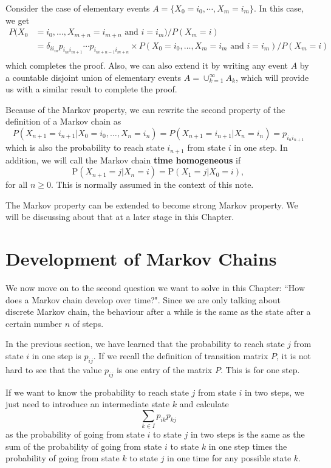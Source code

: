 \documentclass[11pt, a4paper, oneside]{book}
\theoremstyle{definition}
\begin{document}
\noindent Consider the case of elementary events $A = \{ X_0 = i_0, \cdots , X_m = i_m \}$. In this case, we get 
\begin{equation*}
\begin{split}
P(X_0 &= i_0, \dots, X_{m+n} = i_{m+n}\text{ and } i = i_m) / P(X_m = i) \\
&= \delta_{ii_m} p_{i_m i_{m+1}} \cdots p_{i_{m+n-1} i_{m+n}} \times P(X_0 = i_0, \dots, X_m = i_m \text{ and } i = i_m) / P(X_m = i) \\
\end{split}
\end{equation*}
which completes the proof. Also, we can also extend it by writing any event $A$ by a countable disjoint union of elementary events $A = \cup_{k=1}^{\infty} A_k$, which will provide us with a similar result to complete the proof. 

\noindent Because of the Markov property, we can rewrite the second property of the definition of a Markov chain as\[
P(X_{n+1} = i_{n+1} \vert X_0 = i_0, \dots, X_n = i_n) = P(X_{n+1} = i_{n+1} \vert X_n = i_n) = p_{i_n i_{n+1}}
\]
which is also the probability to reach state $i_{n+1}$ from state $i$ in one step. In addition, we will call the Markov chain \textbf{time homogeneous} if \[
\text{P}(X_{n+1}=j|X_n=i) = \text{P}(X_{1}=j|X_0=i),
\]
for all $n \ge 0$. This is normally assumed in the context of this note. 

\noindent The Markov property can be extended to become strong Markov property. We will be discussing about that at a later stage in this Chapter. 

\section{Development of Markov Chains}

\noindent We now move on to the second question we want to solve in this Chapter: ``How does a Markov chain develop over time?". Since we are only talking about discrete Markov chain, the behaviour after a while is the same as the state after a certain number $n$ of steps.

\noindent In the previous section, we have learned that the probability to reach state $j$ from state $i$ in one step is $p_{ij}$. If we recall the definition of transition matrix $P$, it is not hard to see that the value $p_{ij}$ is one entry of the matrix $P$. This is for one step. 

\noindent If we want to know the probability to reach state $j$ from state $i$ in two steps, we just need to introduce an intermediate state $k$ and calculate \[
\sum_{k\in I} p_{ik}p_{kj}
\]
as the probability of going from state $i$ to state $j$ in two steps is the same as the sum of the probability of going from state $i$ to state $k$ in one step times the probability of going from state $k$ to state $j$ in one time for any possible state $k$. 
\end{document}
